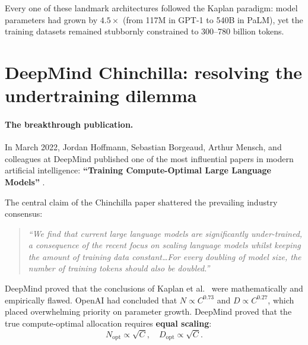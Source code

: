 \documentclass[../../main.tex]{subfiles}
\begin{document}
Every one of these landmark architectures followed the Kaplan paradigm: model parameters had grown by $4.5\times$ (from 117M in GPT-1 to 540B in PaLM), yet the training datasets remained stubbornly constrained to 300--780 billion tokens. 

\section{DeepMind Chinchilla: resolving the undertraining dilemma}
\label{sec:chinchilla_optimality}

\paragraph{The breakthrough publication.}
In March 2022, Jordan Hoffmann, Sebastian Borgeaud, Arthur Mensch, and colleagues at DeepMind published one of the most influential papers in modern artificial intelligence: \textbf{``Training Compute-Optimal Large Language Models''} \cite{hoffmann2022}.

The central claim of the Chinchilla paper shattered the prevailing industry consensus:
\begin{quote}
\emph{``We find that current large language models are significantly under-trained, a consequence of the recent focus on scaling language models whilst keeping the amount of training data constant\dots For every doubling of model size, the number of training tokens should also be doubled.''}
\end{quote}

DeepMind proved that the conclusions of Kaplan et al.~\cite{kaplan2020} were mathematically and empirically flawed. OpenAI had concluded that $N \propto C^{0.73}$ and $D \propto C^{0.27}$, which placed overwhelming priority on parameter growth. DeepMind proved that the true compute-optimal allocation requires \textbf{equal scaling}:
\begin{equation}
\label{eq:equal_scaling_rule}
N_{\text{opt}} \propto \sqrt{C}, \quad D_{\text{opt}} \propto \sqrt{C}.
\end{equation}
\end{document}
